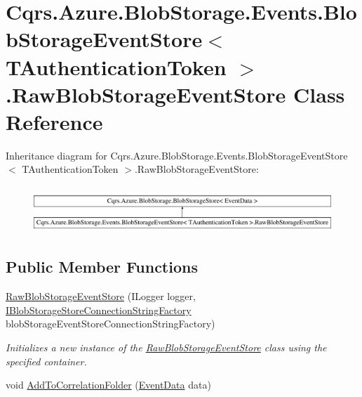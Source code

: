 \hypertarget{classCqrs_1_1Azure_1_1BlobStorage_1_1Events_1_1BlobStorageEventStore_1_1RawBlobStorageEventStore}{}\section{Cqrs.\+Azure.\+Blob\+Storage.\+Events.\+Blob\+Storage\+Event\+Store$<$ T\+Authentication\+Token $>$.Raw\+Blob\+Storage\+Event\+Store Class Reference}
\label{classCqrs_1_1Azure_1_1BlobStorage_1_1Events_1_1BlobStorageEventStore_1_1RawBlobStorageEventStore}
Inheritance diagram for Cqrs.\+Azure.\+Blob\+Storage.\+Events.\+Blob\+Storage\+Event\+Store$<$ T\+Authentication\+Token $>$.Raw\+Blob\+Storage\+Event\+Store\+:\begin{figure}[H]
\begin{center}
\leavevmode
\includegraphics[height=1.755486cm]{classCqrs_1_1Azure_1_1BlobStorage_1_1Events_1_1BlobStorageEventStore_1_1RawBlobStorageEventStore}
\end{center}
\end{figure}
\subsection*{Public Member Functions}
\begin{DoxyCompactItemize}
\item 
\hyperlink{classCqrs_1_1Azure_1_1BlobStorage_1_1Events_1_1BlobStorageEventStore_1_1RawBlobStorageEventStore_a42832e52a20eeb7012526624181f457c}{Raw\+Blob\+Storage\+Event\+Store} (I\+Logger logger, \hyperlink{interfaceCqrs_1_1Azure_1_1BlobStorage_1_1IBlobStorageStoreConnectionStringFactory}{I\+Blob\+Storage\+Store\+Connection\+String\+Factory} blob\+Storage\+Event\+Store\+Connection\+String\+Factory)
\begin{DoxyCompactList}\small\item\em Initializes a new instance of the \hyperlink{classCqrs_1_1Azure_1_1BlobStorage_1_1Events_1_1BlobStorageEventStore_1_1RawBlobStorageEventStore}{Raw\+Blob\+Storage\+Event\+Store} class using the specified container. \end{DoxyCompactList}\item 
void \hyperlink{classCqrs_1_1Azure_1_1BlobStorage_1_1Events_1_1BlobStorageEventStore_1_1RawBlobStorageEventStore_ab23a500302bfa1a04a2150c79f67e452}{Add\+To\+Correlation\+Folder} (\hyperlink{classCqrs_1_1Events_1_1EventData}{Event\+Data} data)
\end{DoxyCompactItemize}
